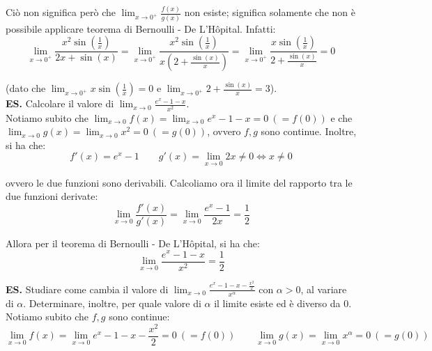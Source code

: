 \documentclass{article}
\begin{document}
\noindent Ciò non significa però che $\lim_{x \to 0^+} \frac{f(x)}{g(x)}$ non esiste; significa solamente che non è possibile applicare teorema di Bernoulli - De L'Hôpital. Infatti:
\begin{equation*}
    \lim_{x \to 0^+} \frac{x^2 \sin\left(\frac{1}{x}\right)}{2x + \sin(x)} = \lim_{x \to 0^+} \frac{x^2 \sin\left(\frac{1}{x}\right)}{x\left(2 + \frac{\sin(x)}{x}\right)} = \lim_{x \to 0^+} \frac{x \sin\left(\frac{1}{x}\right)}{2 + \frac{\sin(x)}{x}} = 0
\end{equation*}

\noindent (dato che $\lim_{x \to 0^+} x \sin(\frac{1}{x}) = 0$ e $\lim_{x \to 0^+} 2 + \frac{\sin(x)}{x} = 3$).\\

\noindent\textbf{ES.} Calcolare il valore di $\lim_{x \to 0} \frac{e^x - 1 - x}{x^2}$.\\
Notiamo subito che $\lim_{x \to 0} f(x) = \lim_{x \to 0} e^x - 1 - x = 0 \ (= f(0))$ e che $\lim_{x \to 0} g(x) = \lim_{x \to 0} x^2 = 0 \ (= g(0))$, ovvero $f, g$ sono continue. Inoltre, si ha che:
\begin{equation*}
    f'(x) = e^x - 1 \qquad g'(x) = \lim_{x \to 0} 2x \neq 0 \iff x \neq 0
\end{equation*}

\noindent ovvero le due funzioni sono derivabili. Calcoliamo ora il limite del rapporto tra le due funzioni derivate:
\begin{equation*}
    \lim_{x \to 0} \frac{f'(x)}{g'(x)} = \lim_{x \to 0} \frac{e^x - 1}{2x} = \frac{1}{2}
\end{equation*}

\noindent Allora per il teorema di Bernoulli - De L'Hôpital, si ha che:
\begin{equation*}
    \lim_{x \to 0} \frac{e^x - 1 - x}{x^2} = \frac{1}{2}
\end{equation*}

\noindent\textbf{ES.} Studiare come cambia il valore di $\lim_{x \to 0} \frac{e^x - 1 - x - \frac{x^2}{2}}{x^\alpha}$ con $\alpha > 0$, al variare di $\alpha$. Determinare, inoltre, per quale valore di $\alpha$ il limite esiste ed è diverso da $0$.\\
Notiamo subito che $f, g$ sono continue:
\begin{equation*}
    \lim_{x \to 0} f(x) = \lim_{x \to 0} e^x - 1- x - \frac{x^2}{2} = 0 \ (= f(0)) \qquad \lim_{x \to 0} g(x) = \lim_{x \to 0} x^\alpha = 0 \ (= g(0))
\end{equation*}
\end{document}
